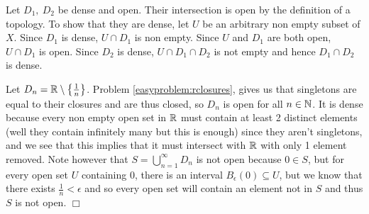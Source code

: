 \documentclass{article}
\begin{document}
 {
    Let $D_{1},\ D_{2}$ be dense and open. Their intersection is open by the definition of a topology. To show that they are dense, let $U$ be an arbitrary non empty subset of $X$. Since $D_{1}$ is dense, $U\cap D_{1}$ is non empty. Since $U$ and $D_{1}$ are both open, $U\cap D_{1}$ is open. Since $D_{2}$ is dense, $U\cap D_{1} \cap D_{2}$ is not empty and hence $D_{1}\cap D_{2}$ is dense.

    Let $D_{n} = \mathbb{R} \setminus \left\{\frac{1}{n}\right\}$. Problem \ref{easyproblem:rclosures}, gives us that singletons are equal to their closures and are thus closed, so $D_{n}$ is open for all $n\in \mathbb{N}$. It is dense because every non empty open set in $\mathbb{R}$ must contain at least 2 distinct elements (well they contain infinitely many but this is enough) since they aren't singletons, and we see that this implies that it must intersect with $\mathbb{R}$ with only 1 element removed. Note however that $S = \bigcup_{n = 1}^{\infty} D_{n}$ is not open because $0\in S$, but for every open set $U$ containing $0$, there is an interval $B_{\epsilon}(0)\subseteq U$, but we know that there exists $\frac{1}{n} < \epsilon$ and so every open set will contain an element not in $S$ and thus $S$ is not open. $\Box$
}
\end{document}
